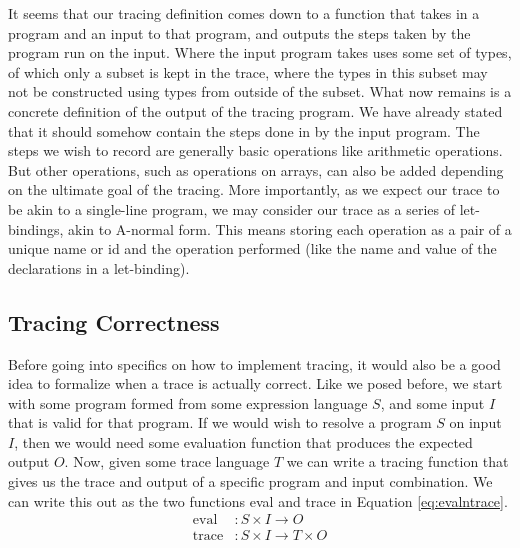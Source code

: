     It seems that our tracing definition comes down to a function that takes in a program and an input to that program, and outputs the steps taken by the program run on the input.
    Where the input program takes uses some set of types, of which only a subset is kept in the trace, where the types in this subset may not be constructed using types from outside of the subset.
    What now remains is a concrete definition of the output of the tracing program.
    We have already stated that it should somehow contain the steps done in by the input program.
    The steps we wish to record are generally basic operations like arithmetic operations.
    But other operations, such as operations on arrays, can also be added depending on the ultimate goal of the tracing.
    More importantly, as we expect our trace to be akin to a single-line program, we may consider our trace as a series of let-bindings, akin to A-normal form\cn.
    This means storing each operation as a pair of a unique name or id and the operation performed (like the name and value of the declarations in a let-binding).
    
    \subsection{Tracing Correctness} \label{sec:correctness}
        Before going into specifics on how to implement tracing, it would also be a good idea to formalize when a trace is actually correct.
        Like we posed before, we start with some program formed from some expression language $S$, and some input $I$ that is valid for that program.
        If we would wish to resolve a program $S$ on input $I$, then we would need some evaluation function that produces the expected output $O$.
        Now, given some trace language $T$ we can write a tracing function that gives us the trace and output of a specific program and input combination.
        We can write this out as the two functions eval and trace in Equation \ref{eq:evalntrace}.
        \begin{equation}
            \begin{aligned}
                \text{eval}&:S\times I\to O\\
                \text{trace}&:S\times I\to T\times O
            \end{aligned}
            \label{eq:evalntrace}
        \end{equation}

